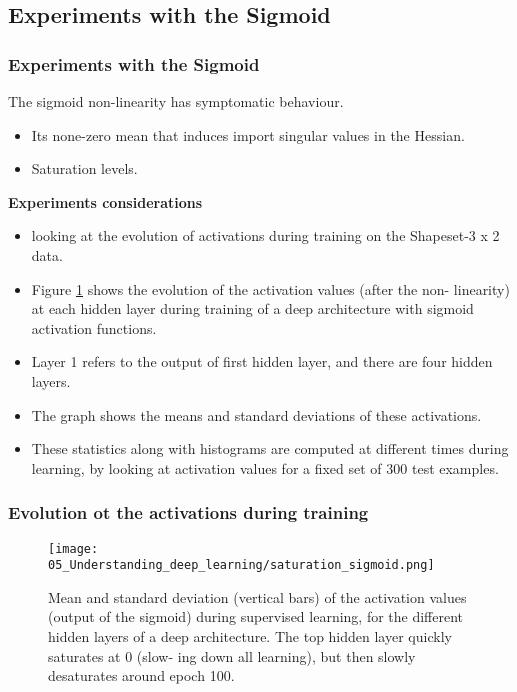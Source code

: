 \subsection{Experiments with the Sigmoid}
\begin{frame}
  \frametitle{Experiments with the Sigmoid}

    The sigmoid non-linearity has symptomatic behaviour.
    
    \begin{itemize}
      \item Its none-zero mean that induces import singular values in the Hessian. 
      \item Saturation levels. 
    \end{itemize} 

    \textbf{Experiments considerations}

    \begin{itemize}
      \item looking at the evolution of activations during training on the Shapeset-3 x 2 data.
      
      \item  Figure \ref{fig:saturation-sigmoid-shapeset3x2} shows the evolution of the activation values (after the non- linearity) at each hidden layer during training of a deep architecture with sigmoid activation functions. 
      
      \item Layer 1 refers to the output of first hidden layer, and there are four hidden layers. 
      
      \item The graph shows the means and standard deviations of these activations. 
      
      \item These statistics along with histograms are computed at different times during learning, by looking at activation values for a fixed set of 300 test examples. 
    \end{itemize}
\end{frame}

\begin{frame}
  \frametitle{Evolution ot the activations during training}
\begin{figure}[t]
  \centering
  \texttt{[image: 05\_Understanding\_deep\_learning/saturation\_sigmoid.png]}
  \caption{Mean and standard deviation (vertical bars) of the activation values (output of the sigmoid) during supervised learning, for the different hidden layers of a deep architecture. The top hidden layer quickly saturates at 0 (slow- ing down all learning), but then slowly desaturates around epoch 100.}
  \label{fig:saturation-sigmoid-shapeset3x2}
\end{figure}

\end{frame}

